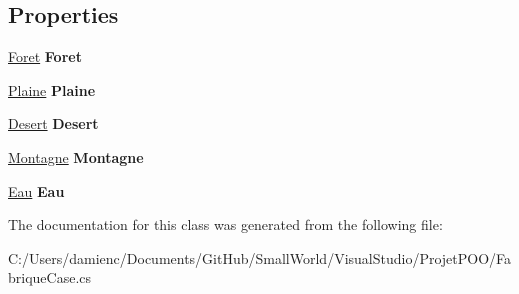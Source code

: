 \subsection*{Properties}
\begin{DoxyCompactItemize}
\item 
\hypertarget{class_small_world_1_1_fabrique_case_a800e3f658e67dcd6ab269386ed08dc2f}{\hyperlink{class_small_world_1_1_foret}{Foret} {\bfseries Foret}}\label{class_small_world_1_1_fabrique_case_a800e3f658e67dcd6ab269386ed08dc2f}

\item 
\hypertarget{class_small_world_1_1_fabrique_case_a97131f6c0a1bc3ceeedf98059fbba0c1}{\hyperlink{class_small_world_1_1_plaine}{Plaine} {\bfseries Plaine}}\label{class_small_world_1_1_fabrique_case_a97131f6c0a1bc3ceeedf98059fbba0c1}

\item 
\hypertarget{class_small_world_1_1_fabrique_case_a960d80498fb7512f1bc57e30b900b958}{\hyperlink{class_small_world_1_1_desert}{Desert} {\bfseries Desert}}\label{class_small_world_1_1_fabrique_case_a960d80498fb7512f1bc57e30b900b958}

\item 
\hypertarget{class_small_world_1_1_fabrique_case_a6b633850fecde0d1a9a42b65eb73b248}{\hyperlink{class_small_world_1_1_montagne}{Montagne} {\bfseries Montagne}}\label{class_small_world_1_1_fabrique_case_a6b633850fecde0d1a9a42b65eb73b248}

\item 
\hypertarget{class_small_world_1_1_fabrique_case_aa247bfdc40a15c5738d48d55e56ad169}{\hyperlink{class_small_world_1_1_eau}{Eau} {\bfseries Eau}}\label{class_small_world_1_1_fabrique_case_aa247bfdc40a15c5738d48d55e56ad169}

\end{DoxyCompactItemize}


The documentation for this class was generated from the following file\-:\begin{DoxyCompactItemize}
\item 
C\-:/\-Users/damienc/\-Documents/\-Git\-Hub/\-Small\-World/\-Visual\-Studio/\-Projet\-P\-O\-O/Fabrique\-Case.\-cs\end{DoxyCompactItemize}
